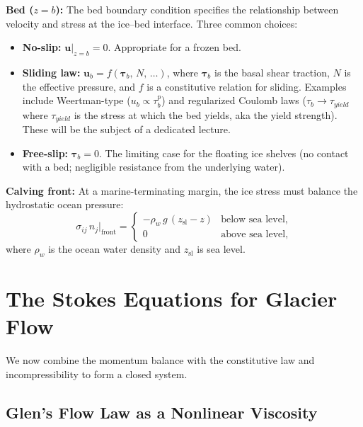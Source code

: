 \documentclass[11pt]{article}
\begin{document}
\medskip
\noindent\textbf{Bed ($z = b$):}  The bed boundary condition specifies the relationship between velocity and stress at the ice--bed interface.  Three common choices:
\begin{itemize}[nosep]
  \item \textbf{No-slip:} $\bm{u}\big|_{z=b} = 0$.  Appropriate for a frozen bed.
  \item \textbf{Sliding law:} $\bm{u}_b = f(\bm{\tau}_b,\,N,\,\ldots)$, where $\bm{\tau}_b$ is the basal shear traction, $N$ is the effective pressure, and $f$ is a constitutive relation for sliding.  Examples include Weertman-type ($u_b \propto \tau_b^p$) and regularized Coulomb laws ($\tau_b \to \tau_{yield}$ where $\tau_{yield}$ is the stress at which the bed yields, aka the yield strength).  These will be the subject of a dedicated lecture.
  \item \textbf{Free-slip:} $\bm{\tau}_b = 0$.  The limiting case for the floating ice shelves (no contact with a bed; negligible resistance from the underlying water).
\end{itemize}

\medskip
\noindent\textbf{Calving front:}  At a marine-terminating margin, the ice stress must balance the hydrostatic ocean pressure:
\begin{equation}
  \sigma_{ij}\,n_j\big|_{\text{front}} =
  \begin{cases}
    -\rho_w\,g\,(z_{\text{sl}} - z) & \text{below sea level}, \\
    0 & \text{above sea level},
  \end{cases}
  \label{eq:bc_calving}
\end{equation}
where $\rho_w$ is the ocean water density and $z_{\text{sl}}$ is sea level.

\section{The Stokes Equations for Glacier Flow}

We now combine the momentum balance with the constitutive law and incompressibility to form a closed system.

\subsection{Glen's Flow Law as a Nonlinear Viscosity}
\end{document}

